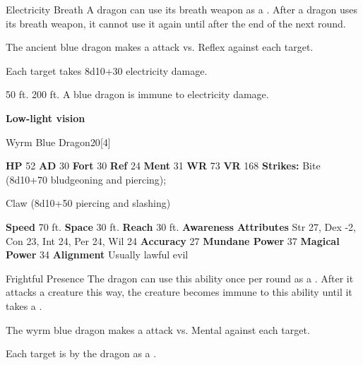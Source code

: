     \begin{freeability}{Electricity Breath}
      A dragon can use its breath weapon as a .
      After a dragon uses its breath weapon, it cannot use it again until after the end of the next round.
      \par The ancient blue dragon makes a  attack
        vs. Reflex against each target.
    
    \hit Each target takes 8d10+30 electricity damage.
    \end{freeability}
  
      
       50 ft.
     200 ft.
     A blue dragon is immune to electricity damage.
    \par\noindent\textbf{Low-light vision}
  

  \begin{monsubsection}{Wyrm Blue Dragon}{20}[4]
    \vspace{-1em}\vspace{-1em}
    \vspace{0em}

    
    

    \begin{spellcontent}
      \begin{spelltargetinginfo}
        \pari \textbf{HP} 52 \monsep
          \textbf{AD} 30 \monsep
          \textbf{Fort} 30 \monsep
          \textbf{Ref} 24 \monsep
          \textbf{Ment} 31
        \pari \textbf{WR} 73 \monsep
        \textbf{VR} 168
        \pari \textbf{Strikes:}
            Bite  (8d10+70 bludgeoning and piercing);
\par Claw  (8d10+50 piercing and slashing)
      \end{spelltargetinginfo}
    \end{spellcontent}
    \begin{monsterfooter}
      \pari \textbf{Speed} 70 ft. \monsep
        \textbf{Space} 30 ft. \monsep
        \textbf{Reach} 30 ft.
      \pari \textbf{Awareness} 
      \pari \textbf{Attributes}
        Str 27, Dex -2,
        Con 23, Int 24,
        Per 24, Wil 24
      \pari \textbf{Accuracy} 27 \monsep
        \textbf{Mundane Power} 37 \monsep
      \textbf{Magical Power} 34
      \pari \textbf{Alignment} Usually lawful evil
    \end{monsterfooter}
  \end{monsubsection}
  \begin{freeability}{Frightful Presence}
      The dragon can use this ability once per round as a .
      After it attacks a creature this way, the creature becomes immune to this ability until it takes a .
      \par The wyrm blue dragon makes a  attack
        vs. Mental against each target.
    
    \hit Each target is  by the dragon as a .
    \end{freeability}
  

